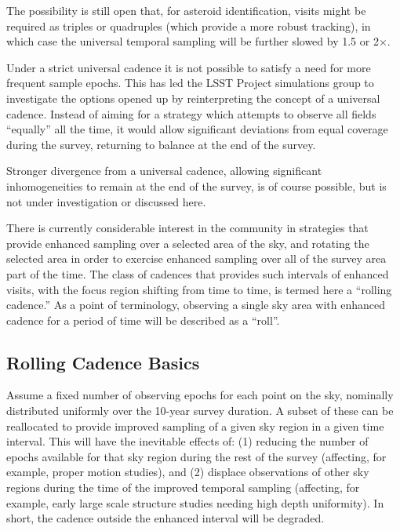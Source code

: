 The possibility is still open that, for asteroid identification, visits
might be required as triples or quadruples (which provide a more robust tracking), in which case the universal
temporal sampling will be further slowed by 1.5 or 2$\times$.

Under a strict universal cadence it is not possible to satisfy a need
for more frequent sample epochs.  This has led the LSST Project
simulations group to investigate the options opened up by reinterpreting
the concept of a universal cadence.  Instead of aiming for a strategy
which attempts to observe all fields ``equally'' all the time, it would
allow significant deviations from equal coverage during the survey,
returning to balance at the end of the survey.

Stronger divergence from a universal cadence, allowing significant
inhomogeneities to remain at the end of the survey, is of course
possible, but is not under investigation or discussed here.

There is currently considerable interest in the community in strategies
that provide enhanced sampling over a selected area of the sky, and
rotating the selected area in order to exercise enhanced sampling over
all of the survey area part of the time.  The class of cadences that
provides such intervals of enhanced visits, with the focus region
shifting from time to time, is termed here a ``rolling cadence.''  As a
point of terminology, observing a single sky area with enhanced cadence
for a period of time will be described as a ``roll''.


\subsection{Rolling Cadence Basics}

Assume a fixed number of observing epochs for each point on the sky,
nominally distributed uniformly over the 10-year survey duration.  A subset of
these can be reallocated to provide improved sampling of a given sky region in a given time interval.
This will have the inevitable effects of: (1) reducing the number of
epochs available for that sky region during the rest of the survey (affecting, for example, proper motion studies), and
(2) displace observations of other sky regions during the time of the
improved temporal sampling (affecting, for example, early large scale structure studies needing high depth uniformity).  In short, the cadence outside the enhanced
interval will be degraded.

